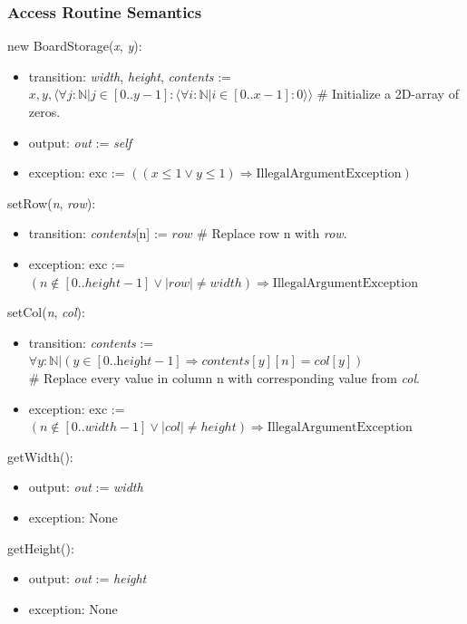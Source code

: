 \documentclass{article}
\begin{document}
		\subsubsection*{Access Routine Semantics}
			\noindent new BoardStorage(\textit{x}, \textit{y}):
			\begin{itemize}
				\item transition: \textit{width}, \textit{height}, \textit{contents} := 
					$\mathit{x}, \mathit{y}, \langle \forall j : \mathbb{N} | j \in [0..\textit{y}-1] : \langle \forall i : \mathbb{N} | i \in [0..\textit{x}-1] : 0 \rangle \rangle$ \# Initialize a 2D-array of zeros.
				\item output: \textit{out} := \textit{self}
				\item exception: exc := $((\mathit{x} \le 1 \vee \mathit{y} \le 1) \Rightarrow \textrm{IllegalArgumentException})$
			\end{itemize}

			\noindent setRow(\textit{n}, \textit{row}):
			\begin{itemize}
				\item transition: \textit{contents}[n] := $\mathit{row}$ \# Replace row n with \textit{row}.
				\item exception: exc := $(n \notin [0..height-1] \vee |row| \neq width) \Rightarrow \textrm{IllegalArgumentException}$
			\end{itemize}

			\noindent setCol(\textit{n}, \textit{col}):
			\begin{itemize}
				\item transition: \textit{contents} := $\forall y : \mathbb{N} | (y \in [0..\textit{height}-1] \Rightarrow contents[y][n] = \mathit{col}[y])$\\
					\# Replace every value in column n with corresponding value from \textit{col}.
				\item exception: exc := $(n \notin [0..width-1] \vee |col| \neq height) \Rightarrow \textrm{IllegalArgumentException}$
			\end{itemize}

			\noindent getWidth():
			\begin{itemize}
				\item output: \textit{out} := \textit{width}
				\item exception: None
			\end{itemize}

			\noindent getHeight():
			\begin{itemize}
				\item output: \textit{out} := \textit{height}
				\item exception: None
			\end{itemize}
\end{document}
